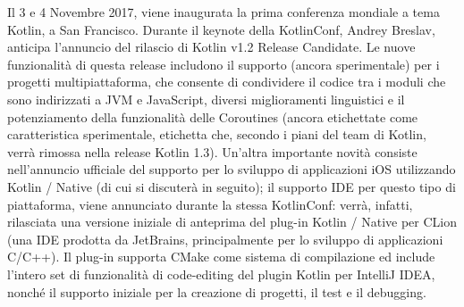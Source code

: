 Il 3 e 4 Novembre 2017, viene inaugurata la prima conferenza mondiale a tema Kotlin, a San Francisco. Durante il keynote della KotlinConf, Andrey Breslav, anticipa l’annuncio del rilascio di Kotlin v1.2 Release Candidate. Le nuove funzionalità di questa release includono il supporto (ancora sperimentale) per i progetti multipiattaforma, che consente di condividere il codice tra i moduli che sono indirizzati a JVM e JavaScript, diversi miglioramenti linguistici e il potenziamento della funzionalità delle Coroutines (ancora etichettate come caratteristica sperimentale, etichetta che, secondo i piani del team di Kotlin, verrà rimossa nella release Kotlin 1.3). Un’altra importante novità consiste nell’annuncio ufficiale del supporto per lo sviluppo di applicazioni iOS utilizzando Kotlin / Native (di cui si discuterà in seguito); il supporto IDE per questo tipo di piattaforma, viene annunciato durante la stessa KotlinConf: verrà, infatti, rilasciata una versione iniziale di anteprima del plug-in Kotlin / Native per CLion (una IDE prodotta da JetBrains, principalmente per lo sviluppo di applicazioni C/C++). Il plug-in supporta CMake come sistema di compilazione ed include l'intero set di funzionalità di code-editing del plugin Kotlin per IntelliJ IDEA, nonché il supporto iniziale per la creazione di progetti, il test e il debugging.\\

